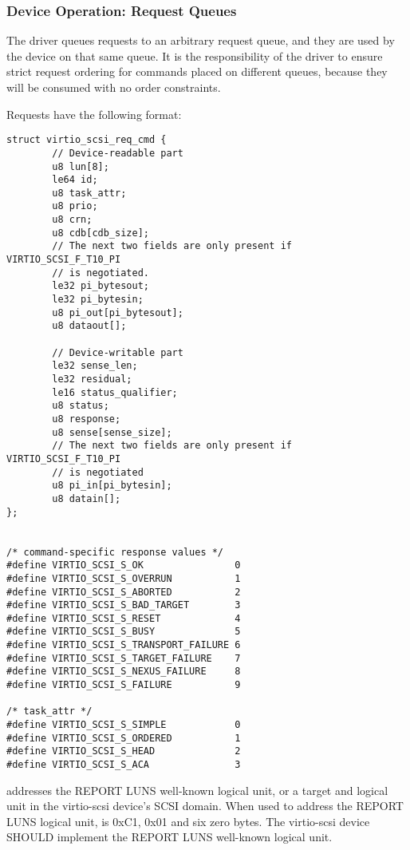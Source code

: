\subsubsection{Device Operation: Request Queues}\label{sec:Device Types / SCSI Host Device / Device Operation / Device Operation: Request Queues}

The driver queues requests to an arbitrary request queue, and
they are used by the device on that same queue. It is the
responsibility of the driver to ensure strict request ordering
for commands placed on different queues, because they will be
consumed with no order constraints.

Requests have the following format:

\begin{lstlisting}
struct virtio_scsi_req_cmd {
        // Device-readable part
        u8 lun[8];
        le64 id;
        u8 task_attr;
        u8 prio;
        u8 crn;
        u8 cdb[cdb_size];
        // The next two fields are only present if VIRTIO_SCSI_F_T10_PI
        // is negotiated.
        le32 pi_bytesout;
        le32 pi_bytesin;
        u8 pi_out[pi_bytesout];
        u8 dataout[];

        // Device-writable part
        le32 sense_len;
        le32 residual;
        le16 status_qualifier;
        u8 status;
        u8 response;
        u8 sense[sense_size];
        // The next two fields are only present if VIRTIO_SCSI_F_T10_PI
        // is negotiated
        u8 pi_in[pi_bytesin];
        u8 datain[];
};


/* command-specific response values */
#define VIRTIO_SCSI_S_OK                0
#define VIRTIO_SCSI_S_OVERRUN           1
#define VIRTIO_SCSI_S_ABORTED           2
#define VIRTIO_SCSI_S_BAD_TARGET        3
#define VIRTIO_SCSI_S_RESET             4
#define VIRTIO_SCSI_S_BUSY              5
#define VIRTIO_SCSI_S_TRANSPORT_FAILURE 6
#define VIRTIO_SCSI_S_TARGET_FAILURE    7
#define VIRTIO_SCSI_S_NEXUS_FAILURE     8
#define VIRTIO_SCSI_S_FAILURE           9

/* task_attr */
#define VIRTIO_SCSI_S_SIMPLE            0
#define VIRTIO_SCSI_S_ORDERED           1
#define VIRTIO_SCSI_S_HEAD              2
#define VIRTIO_SCSI_S_ACA               3
\end{lstlisting}

 addresses the REPORT LUNS well-known logical unit, or
a target and logical unit in the virtio-scsi device's SCSI domain.
When used to address the REPORT LUNS logical unit,  is 0xC1,
0x01 and six zero bytes.  The virtio-scsi device SHOULD implement the
REPORT LUNS well-known logical unit.

